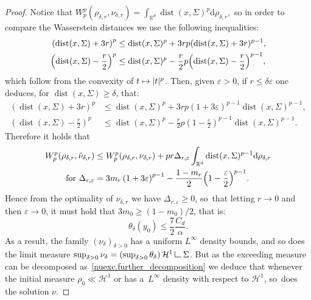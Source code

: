 \documentclass[10pt]{amsart}
\newcommand\mto{\mathchoice{\longmapsto}{\mapsto}{\mapsto}{\mapsto}}
\theoremstyle{definition}
\newcommand\LM[1]{\hbox{\vrule width.5pt \vbox to#1pt{\vfill \hrule width#1pt height.5pt}}}
\newcommand\LL{{\mathchoice {\>\LM7\>}{\>\LM7\>}{\,\LM5\,}{\,\LM{3.35}\,}}}
\newcommand{\mres}{\LL}
\newcommand\cH{\mathcal{H}}
\newcommand{\RR}{\mathbb{R}}
\DeclareMathOperator{\dist}{dist}
\newcommand\dd{\mathrm{d}}
\begin{document}
\begin{proof}
Notice that
$
W_p^p(\rho_{\delta, r},\nu_{\delta, r})
=
\int_{\RR^d} \dist(x,\Sigma)^p\dd \rho_{\delta,r},
$
so in order to compare the Wasserstein distances we use the following inequalities:
\begin{align*}
\left(\dist(x,\Sigma) + 3r\right)^p
&\le
\dist(x,\Sigma)^p
+
3rp
(\dist(x,\Sigma)+3r)^{p-1}, \\
\left(\dist(x,\Sigma) -\frac{r}{2}\right)^p
&\le
\dist(x,\Sigma)^p
-
\frac{r}{2}p
\Bigl(\dist(x,\Sigma)-\frac{r}{2}\Bigr)^{p-1},
\end{align*}
which follow from the convexity of $t\mto |t|^p$.
Then, given $\varepsilon>0$, if $r\le \delta\varepsilon$ one deduces,
for $\dist(x,\Sigma)\ge \delta$, that:
\begin{align*}
\left(\dist(x,\Sigma) + 3r\right)^p
&\le
\dist(x,\Sigma)^p
+
3 r p(1+3\varepsilon)^{p-1}
\dist(x,\Sigma)^{p-1}, \\
\left(\dist(x,\Sigma) -\frac{r}{2}\right)^p
&\le
\dist(x,\Sigma)^p
-
\frac{r}{2}p \left(1-\frac{\varepsilon}{2}\right)^{p-1}
\dist(x,\Sigma)^{p-1}.
\end{align*}
Therefore it holds that
\begin{align*}
W_p^p(\rho_{\delta, r}, \tilde\nu_{\delta, r})
&\le
W_p^p(\rho_{\delta, r}, \nu_{\delta, r})
+
pr\Delta_{r,\varepsilon}
\int_{\RR^d}
\dist(x,\Sigma)^{p-1}\dd \rho_{\delta,r}\\
\text{ for }
\Delta_{r,\varepsilon}
&=
3m_{r}
\left(
1 + 3\varepsilon
\right)^{p-1}
-
\frac{1 - m_r}{2}
\Bigl(
1 - \frac{\varepsilon}{2}
\Bigr)^{p-1}.
\end{align*}
Hence from the optimality of $\nu_{\delta,r}$ we have $\Delta_{r,\varepsilon} \ge 0$, so~that letting $r \to 0$ and then $\varepsilon\to 0$, it must hold that
$3 m_0\ge (1-m_0)/2$, that is:
\[
\theta_\delta(y_0)
\le
\frac{7}{2}\frac{C_d}{\alpha}.
\]
As a result, the family $\left(\nu_\delta\right)_{\delta > 0}$ has a uniform $L^\infty$ density bounds, and so does the limit measure $\sup_{\delta > 0} \nu_\delta = \left(\sup_{\delta > 0}\theta_\delta\right)\cH^1\mres \Sigma$. But as the exceeding measure can be decomposed as~\eqref{nuexc.further_decomposition} we deduce that
whenever the initial measure $\rho_0 \ll \cH^1$ or has a~$L^{\infty}$ density with respect to $\cH^1$, so~does the solution $\nu$.
\end{proof}
\end{document}
